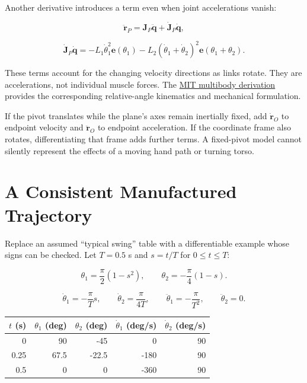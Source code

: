 Another derivative introduces a term even when joint accelerations vanish:

\[
\ddot{\bm r}_P=\bm J_P\ddot{\bm q}+\dot{\bm J}_P\dot{\bm q},
\]

\[
\dot{\bm J}_P\dot{\bm q}
=-L_1\dot\theta_1^2\bm e(\theta_1)
-L_2(\dot\theta_1+\dot\theta_2)^2\bm e(\theta_1+\theta_2).
\]

These terms account for the changing velocity directions as links rotate. They are accelerations, not individual muscle forces. The \href{https://underactuated.mit.edu/multibody.html}{MIT multibody derivation} provides the corresponding relative-angle kinematics and mechanical formulation.

If the pivot translates while the plane's axes remain inertially fixed, add \(\dot{\bm r}_O\) to endpoint velocity and \(\ddot{\bm r}_O\) to endpoint acceleration. If the coordinate frame also rotates, differentiating that frame adds further terms. A fixed-pivot model cannot silently represent the effects of a moving hand path or turning torso.

\section{A Consistent Manufactured Trajectory}\label{ch02:a-consistent-manufactured-trajectory}

\protect{}\label{ch02:phase-space-portrait-of-a-swing}{}

Replace an assumed ``typical swing'' table with a differentiable example whose signs can be checked. Let \(T=0.5\) s and \(s=t/T\) for \(0\leq t\leq T\):

\[
\theta_1=\frac{\pi}{2}(1-s^2),\qquad
\theta_2=-\frac{\pi}{4}(1-s).
\]

\[
\dot\theta_1=-\frac{\pi}{T}s,\qquad
\dot\theta_2=\frac{\pi}{4T},\qquad
\ddot\theta_1=-\frac{\pi}{T^2},\qquad \ddot\theta_2=0.
\]

\begin{center}
\small
\begin{tabular}{rrrrr}
\toprule
$t$ (s)&$\theta_1$ (deg)&$\theta_2$ (deg)&$\dot\theta_1$ (deg/s)&$\dot\theta_2$ (deg/s)\\
\midrule
0&90&-45&0&90\\
0.25&67.5&-22.5&-180&90\\
0.5&0&0&-360&90\\
\bottomrule
\end{tabular}
\end{center}


